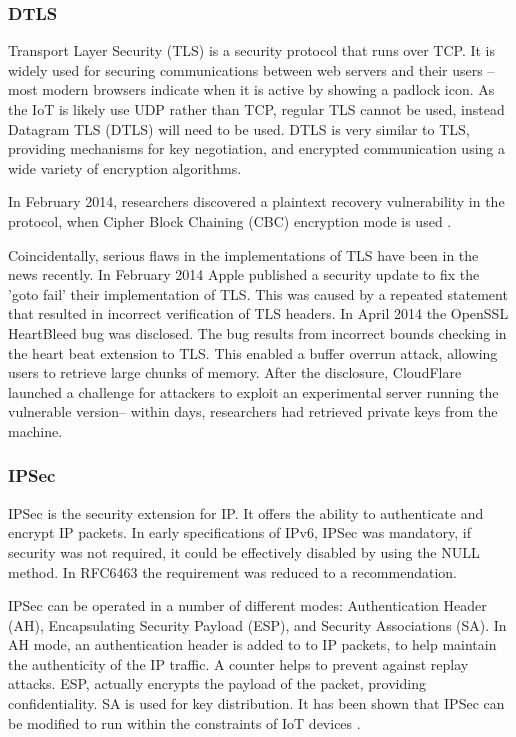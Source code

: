\documentclass[10pt,journal,compsoc]{IEEEtran}
\begin{document}
\subsubsection{DTLS}
Transport Layer Security (TLS) is a security protocol that runs over TCP. It is
widely used for securing communications between web servers and their users --
most modern browsers indicate when it is active by showing a padlock icon. As
the IoT is likely use UDP rather than TCP, regular TLS cannot be used, instead
Datagram TLS (DTLS) will need to be used. DTLS is very similar to TLS,
providing mechanisms for key negotiation, and encrypted communication using a
wide variety of encryption algorithms.  

In February 2014, researchers discovered a plaintext recovery vulnerability in
the protocol, when Cipher Block Chaining (CBC) encryption mode is used
\cite{AlFardan2012}. 

Coincidentally, serious flaws in the implementations of TLS have been in the
news recently. In February 2014 Apple published a security update to fix the
'goto fail' their implementation of TLS.  This was caused by a repeated
statement that resulted in incorrect verification of TLS headers. In April 2014
the OpenSSL HeartBleed bug was disclosed. The bug results from incorrect bounds
checking in the heart beat extension to TLS. This enabled a buffer overrun
attack, allowing users to retrieve large chunks of memory. After the
disclosure, CloudFlare launched a challenge for attackers to exploit an
experimental server running the vulnerable version-- within days, researchers
had retrieved private keys from the machine.

\subsubsection{IPSec}
IPSec is the security extension for IP. It offers the ability to authenticate
and encrypt IP packets. In early specifications of IPv6, IPSec was mandatory,
if security was not required, it could be effectively disabled by using the
NULL method. In RFC6463 the requirement was reduced to a recommendation. 

IPSec can be operated in a number of different modes: Authentication Header
(AH), Encapsulating Security Payload (ESP), and Security Associations (SA).  In
AH mode, an authentication header is added to to IP packets, to help maintain
the authenticity of the IP traffic. A counter helps to prevent against replay
attacks. ESP, actually encrypts the payload of the packet, providing
confidentiality. SA is used for key distribution. It has been shown that IPSec
can be modified to run within the constraints of IoT devices
\cite{Rubertis2013}.  
\end{document}
